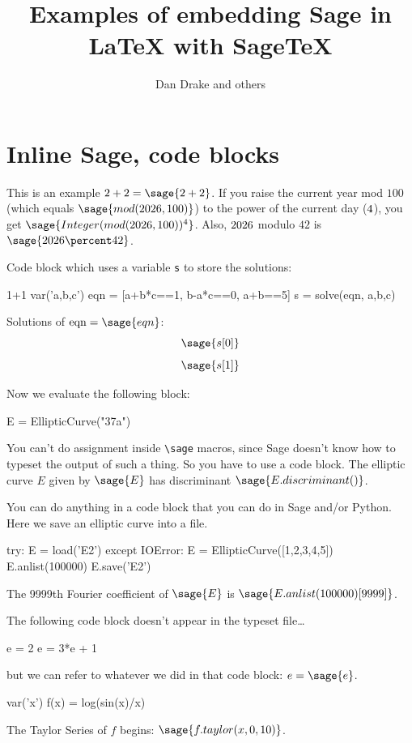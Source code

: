 \documentclass{article}
\title{Examples of embedding Sage in \LaTeX{} with \textsf{Sage\TeX}}
\author{Dan Drake and others}
\begin{document}
\maketitle

\section{Inline Sage, code blocks}

This is an example $2+2=\sage{2+2}$. If you raise the current year mod
$100$ (which equals $\sage{mod(\the\year, 100)}$) to the power of the
current day ($\the\day$), you get $\sage{Integer(mod(\the\year,
100))^\the\day}$. Also, $\the\year$ modulo $42$ is $\sage{\the\year
\percent 42}$.

Code block which uses a variable \texttt{s} to store the solutions:
\begin{sageblock}
 1+1
 var('a,b,c')
 eqn = [a+b*c==1, b-a*c==0, a+b==5]
 s = solve(eqn, a,b,c)
\end{sageblock}

Solutions of $\mbox{eqn}=\sage{eqn}$:
\[
\sage{s[0]}
\]
\[
\sage{s[1]}
\]

Now we evaluate the following block:
\begin{sageblock}
E = EllipticCurve("37a")
\end{sageblock}
You can't do assignment inside \verb|\sage| macros, since Sage doesn't
know how to typeset the output of such a thing. So you have to use a
code block. The elliptic curve $E$ given by $\sage{E}$ has discriminant
$\sage{E.discriminant()}$.

You can do anything in a code block that you can do in Sage and/or
Python. Here we save an elliptic curve into a file.
\begin{sageblock}
try:
    E = load('E2')
except IOError:
    E = EllipticCurve([1,2,3,4,5])
    E.anlist(100000)
    E.save('E2')
\end{sageblock}

The 9999th Fourier coefficient of $\sage{E}$ is
$\sage{E.anlist(100000)[9999]}$.

The following code block doesn't appear in the typeset file\dots
\begin{sagesilent}
  e = 2
  e = 3*e + 1
\end{sagesilent}
but we can refer to whatever we did in that code block: $e=\sage{e}$.

\begin{sageblock}
  var('x')
  f(x) = log(sin(x)/x)
\end{sageblock}
The Taylor Series of $f$ begins: $\sage{ f.taylor(x, 0, 10) }$.
\end{document}
